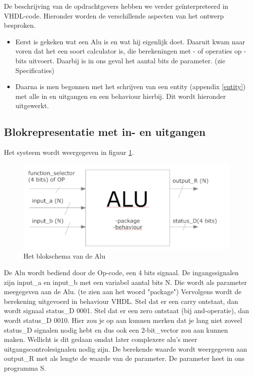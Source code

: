 \documentclass{article}
\begin{document}
De beschrijving van de opdrachtgevers hebben we verder geïnterpreteerd in VHDL-code. Hieronder worden de verschillende aspecten van het ontwerp besproken. 
\begin{itemize}
\item Eerst is gekeken wat een Alu is en wat hij eigenlijk doet. Daaruit kwam naar voren dat het een soort calculator is, die berekeningen met - of operaties op - bits uitvoert.  Daarbij is in ons geval het aantal bits de parameter. (zie Specificaties)

\item Daarna  is men begonnen met het schrijven van een entity (appendix \ref{entity}) met alle in en uitgangen en een behaviour hierbij. Dit wordt hieronder uitgewerkt.  
\end{itemize}
\subsection{Blokrepresentatie met in- en uitgangen}
Het systeem wordt weergegeven in figuur \ref{1}. 
\begin{figure} [h!]
\includegraphics [scale = .4]{figures/blk}
\caption{Het blokschema van de Alu}
\label{1}
\end{figure}
De Alu wordt bediend door de Op-code, een 4 bits signaal. De ingangssignalen zijn input\_a en input\_b met een variabel aantal bits N. Die wordt als parameter meegegeven aan de Alu. (te zien aan het woord "package") Vervolgens wordt de berekening uitgevoerd in behaviour VHDL. Stel dat er een carry ontstaat, dan wordt signaal status\_D 0001. Stel dat er een zero ontstaat (bij and-operatie), dan wordt status\_D 0010. Hier zou je op aan kunnen merken dat je lang niet zoveel status\_D signalen nodig hebt en dus ook een 2-bit\_vector zou aan kunnen maken. Wellicht is dit gedaan omdat later complexere alu's meer uitgangscontrolesignalen nodig zijn. De berekende waarde wordt weergegeven aan output\_R
met als lengte de waarde van de parameter. De parameter heet in ons programma S. 
\end{document}
